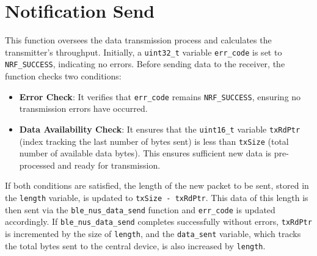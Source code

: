 \documentclass{Configuration_Files/PoliMi3i_thesis}
\begin{document}
\section*{Notification Send}
This function oversees the data transmission process and calculates the transmitter's throughput. Initially, a \texttt{uint32\_t} variable \texttt{err\_code} is set to \texttt{NRF\_SUCCESS}, indicating no errors. Before sending data to the receiver, the function checks two conditions:

\begin{itemize}
    \item \textbf{Error Check}: It verifies that \texttt{err\_code} remains \texttt{NRF\_SUCCESS}, ensuring no transmission errors have occurred.
    \item \textbf{Data Availability Check}: It ensures that the \texttt{uint16\_t} variable \texttt{txRdPtr} (index tracking the last number of bytes sent) is less than \texttt{txSize} (total number of available data bytes). This ensures sufficient new data is pre-processed and ready for transmission.
\end{itemize}

If both conditions are satisfied, the length of the new packet to be sent, stored in the \texttt{length} variable, is updated to \texttt{txSize - txRdPtr}. This data of this length is then sent via the \texttt{ble\_nus\_data\_send} function and \texttt{err\_code} is updated accordingly. If \texttt{ble\_nus\_data\_send} completes successfully without errors, \texttt{txRdPtr} is incremented by the size of \texttt{length}, and the \texttt{data\_sent} variable, which tracks the total bytes sent to the central device, is also increased by \texttt{length}. 
\end{document}

